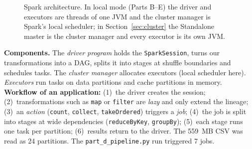 \documentclass[11pt,a4paper]{article}
\begin{document}
\begin{figure}[H]\centering
{}
\caption{Spark architecture. In local mode (Parts B--E) the driver and executors are threads
of one JVM and the cluster manager is Spark's local scheduler; in Section~\ref{sec:cluster}
the Standalone master is the cluster manager and every executor is its own JVM.}
\end{figure}

\textbf{Components.}
The \emph{driver program} holds the \texttt{SparkSession}, turns our transformations into a
DAG, splits it into stages at shuffle boundaries and schedules tasks.
The \emph{cluster manager} allocates executors (local scheduler here).
\emph{Executors} run tasks on data partitions and cache partitions in memory.
\textbf{Workflow of an application:} (1)~the driver creates the session;
(2)~transformations such as \texttt{map} or \texttt{filter} are \emph{lazy} and only extend
the lineage; (3)~an \emph{action} (\texttt{count}, \texttt{collect}, \texttt{takeOrdered})
triggers a \emph{job}; (4)~the job is split into stages at wide dependencies
(\texttt{reduceByKey}, \texttt{groupBy}); (5)~each stage runs one task per partition;
(6)~results return to the driver. The 559~MB CSV was read as 24 partitions.
The \texttt{part\_d\_pipeline.py} run triggered 7 jobs.
\end{document}

